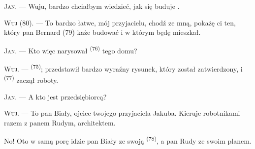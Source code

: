 %
%
%

\VUsaut{6.0mm}
\VUsaut{1.4mm}
\VUsaut{2.2mm}

\VUsaut{3.0mm}

\textsc{Jan}. --- Wuju, bardzo chciałbym wiedzieć, jak się buduje .

\textsc{Wuj} (80). --- To bardzo łatwe, mój przyjacielu, chodź ze mną, pokażę ci ten,
który pan Bernard (79) każe budować i w którym będę mieszkał.

\textsc{Jan}. --- Kto więc narysował  \textsuperscript{(76)} tego domu?

\textsc{Wuj}. ---  \textsuperscript{(75)}; przedstawił bardzo wyraźny
rysunek, który został zatwierdzony, i  \textsuperscript{(77)}
zaczął roboty.

\textsc{Jan}. --- A kto jest przedsiębiorcą?

\textsc{Wuj}. --- To pan Biały, ojciec twojego przyjaciela Jakuba. Kieruje robotnikami
razem z panem Rudym, architektem.

No! Oto w samą porę idzie pan Biały ze swoją  \textsuperscript{(78)}, a
pan Rudy ze swoim planem.

